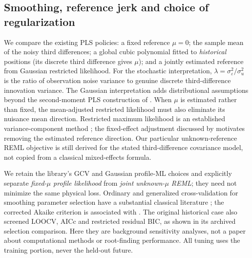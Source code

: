 \subsection{Smoothing, reference jerk and choice of regularization}
We compare the existing PLS policies: a fixed reference
$\mu=0$; the sample mean of the noisy third differences;
a global cubic polynomial fitted to \emph{historical}
positions (its discrete third difference gives $\mu$);
and a jointly estimated reference from Gaussian restricted
likelihood. For the stochastic interpretation,
$\lambda=\sigma_\varepsilon^2/\sigma_u^2$ is the ratio
of observation noise variance to genuine discrete
third-difference innovation variance. The Gaussian
interpretation adds distributional assumptions beyond
the second-moment PLS construction of \citet{guerrero2007}.
When $\mu$ is estimated rather than fixed, the
mean-adjusted restricted likelihood must also eliminate
its nuisance mean direction. Restricted maximum likelihood is an
established variance-component method
\citep{patterson1971,harville1977}; the fixed-effect
adjustment discussed by \citet{harville1977} motivates
removing the estimated reference direction.
Our particular unknown-reference REML objective is still
derived for the stated third-difference covariance model,
not copied from a classical mixed-effects formula.

We retain the library's GCV and Gaussian profile-ML choices
and explicitly separate \emph{fixed-$\mu$ profile likelihood}
from \emph{joint unknown-$\mu$ REML}; they need not minimize
the same physical loss. Ordinary and generalized cross-validation for smoothing parameter
selection have a substantial classical literature
\citep{craven1979,weinert2007}; the corrected Akaike criterion is
associated with \citet{hurvich1998}. The original historical case
also screened LOOCV, AICc and restricted residual BIC,
as shown in its archived selection comparison. Here
they are background sensitivity analyses, not a paper
about computational methods or root-finding performance.
All tuning uses the training portion, never the held-out future.

